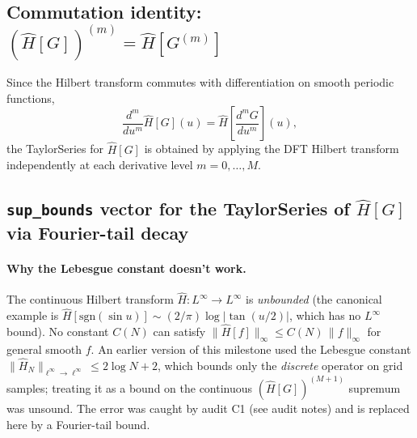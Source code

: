 \documentclass[11pt]{article}
\theoremstyle{definition}
\begin{document}
\subsection{Commutation identity: $(\hat H[G])^{(m)} = \hat H[G^{(m)}]$}

Since the Hilbert transform commutes with differentiation on smooth periodic functions,
\[
  \frac{d^m}{du^m}\hat H[G](u) = \hat H\!\left[\frac{d^m G}{du^m}\right](u),
\]
the TaylorSeries for $\hat H[G]$ is obtained by applying the DFT Hilbert transform
independently at each derivative level $m = 0,\ldots,M$.

\subsection{\texttt{sup\_bounds} vector for the TaylorSeries of $\hat H[G]$ via Fourier-tail decay}

\paragraph{Why the Lebesgue constant doesn't work.}
The continuous Hilbert transform $\hat H : L^\infty \to L^\infty$ is
\emph{unbounded} (the canonical example is $\hat H[\mathrm{sgn}(\sin u)]
\sim (2/\pi)\log|\tan(u/2)|$, which has no $L^\infty$ bound).  No constant
$C(N)$ can satisfy $\|\hat H[f]\|_\infty \le C(N)\,\|f\|_\infty$ for general
smooth $f$.  An earlier version of this milestone used the Lebesgue constant
$\|\hat H_N\|_{\ell^\infty\to\ell^\infty} \le 2\log N + 2$, which bounds only
the \emph{discrete} operator on grid samples; treating it as a bound on the
continuous $(\hat H[G])^{(M+1)}$ supremum was unsound.  The error was caught
by audit C1 (see audit notes) and is replaced here by a Fourier-tail bound.
\end{document}
